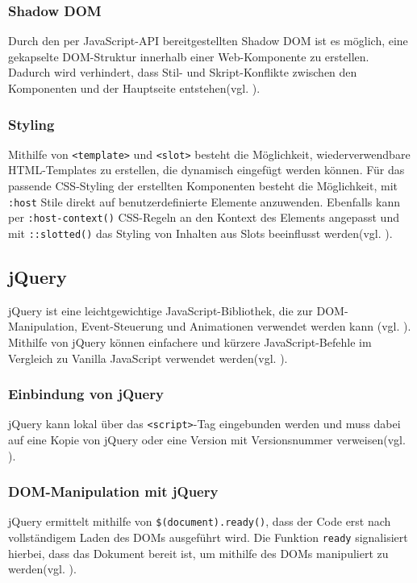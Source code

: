 \documentclass[oneside]{ausarbeitung}
\begin{document}
\subsubsection{Shadow DOM}
Durch den per JavaScript-API bereitgestellten Shadow DOM ist es möglich, eine gekapselte DOM-Struktur innerhalb einer Web-Komponente zu erstellen. Dadurch wird verhindert, dass Stil- und Skript-Konflikte zwischen den Komponenten und der Hauptseite entstehen(vgl. \parencite{webcomponents}).

\subsubsection{Styling}
Mithilfe von \texttt{<template>} und \texttt{<slot>} besteht die Möglichkeit, wiederverwendbare HTML-Templates zu erstellen, die dynamisch eingefügt werden können. Für das passende CSS-Styling der erstellten Komponenten besteht die Möglichkeit, mit \texttt{:host} Stile direkt auf benutzerdefinierte Elemente anzuwenden. Ebenfalls kann per \texttt{:host-context()} CSS-Regeln an den Kontext des Elements angepasst und mit \texttt{::slotted()} das Styling von Inhalten aus Slots beeinflusst werden(vgl. \parencite{webcomponents}).


\subsection{jQuery}
jQuery ist eine leichtgewichtige JavaScript-Bibliothek, die zur DOM-Manipulation, Event-Steuerung und Animationen verwendet werden kann (vgl. \parencite{jqueryAPI}).  
Mithilfe von jQuery können einfachere und kürzere JavaScript-Befehle im Vergleich zu Vanilla JavaScript verwendet werden(vgl. \parencite{jqueryAPI}).  

\subsubsection{Einbindung von jQuery}
jQuery kann lokal über das \texttt{\textless script\textgreater}-Tag eingebunden werden und muss dabei auf eine Kopie von jQuery oder eine Version mit Versionsnummer verweisen(vgl. \parencite{jqueryAPI}).  

\subsubsection{DOM-Manipulation mit jQuery}
jQuery ermittelt mithilfe von \texttt{\$(document).ready()}, dass der Code erst nach vollständigem Laden des DOMs ausgeführt wird. Die Funktion \texttt{ready} signalisiert hierbei, dass das Dokument bereit ist, um mithilfe des DOMs manipuliert zu werden(vgl. \parencite{jqueryAPI}).  
\end{document}

